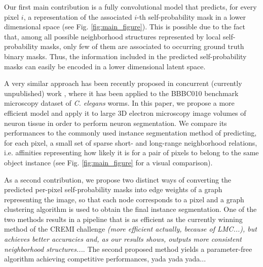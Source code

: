 Our first main contribution is a fully convolutional model that predicts, for every pixel $i$, a representation of the associated $i$-th self-probability mask in a lower dimensional space (see Fig. \ref{fig:main_figure}). This is possible due to the fact that, among all possible neighborhood structures represented by local self-probability masks, only few of them are associated to occurring ground truth binary masks. Thus, the information included in the predicted self-probability masks can easily be encoded in a lower dimensional latent space. 

A very similar approach has been recently proposed in concurrent (currently unpublished) work \cite{hirsch2020patchperpix}, where it has been applied to the BBBC010 benchmark microscopy dataset of \emph{C. elegans} worms. In this paper, we propose a more efficient model and apply it to large 3D electron microscopy image volumes of neuron tissue in order to perform neuron segmentation. 
We compare its performances to the commonly used instance segmentation method of predicting, for each pixel, a small set of sparse short- and long-range neighborhood relations, i.e. affinities representing how likely it is for a pair of pixels to belong to the same object instance (see Fig. \ref{fig:main_figure} for a visual comparison).

As a second contribution, we propose two distinct ways of converting the predicted per-pixel self-probability masks into edge weights of a graph representing the image, so that each node corresponds to a pixel and a graph clustering algorithm is used to obtain the final instance segmentation.
One of the two methods results in a pipeline that is as efficient as the currently winning method of the CREMI challenge \emph{(more efficient actually, because of LMC...), but achieves better accuracies and, as our results shows, outputs more consistent neighborhood structures...}.
The second proposed method yields a parameter-free algorithm achieving competitive performances, yada yada yada... 




